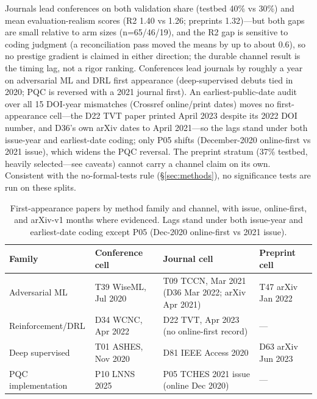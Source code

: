 Journals lead conferences on both validation share (testbed 40\% vs 30\%) and mean evaluation-realism scores (R2 1.40 vs 1.26; preprints 1.32)---but both gaps are small relative to arm sizes (n=65/46/19), and the R2 gap is sensitive to coding judgment (a reconciliation pass moved the means by up to about 0.6), so no prestige gradient is claimed in either direction; the durable channel result is the timing lag, not a rigor ranking. Conferences lead journals by roughly a year on adversarial ML and DRL first appearance (deep-supervised debuts tied in 2020; PQC is reversed with a 2021 journal first). An earliest-public-date audit over all 15 DOI-year mismatches (Crossref online/print dates) moves no first-appearance cell---the D22 TVT paper printed April 2023 despite its 2022 DOI number, and D36's own arXiv dates to April 2021---so the lags stand under both issue-year and earliest-date coding; only P05 shifts (December-2020 online-first vs 2021 issue), which widens the PQC reversal. The preprint stratum (37\% testbed, heavily selected---see caveats) cannot carry a channel claim on its own. Consistent with the no-formal-tests rule (\S\ref{sec:methods}), no significance tests are run on these splits.

\begin{table}[tbp]
\centering
\footnotesize
\caption{First-appearance papers by method family and channel, with issue, online-first, and arXiv-v1 months where evidenced. Lags stand under both issue-year and earliest-date coding except P05 (Dec-2020 online-first vs 2021 issue).}
\label{tab:firstappear}
\begin{tabular}{@{}l l p{4.6cm} l@{}}
\toprule
Family & Conference cell & Journal cell & Preprint cell \\
\midrule
Adversarial ML & T39 WiseML, Jul 2020 & T09 TCCN, Mar 2021 (D36 Mar 2022; arXiv Apr 2021) & T47 arXiv Jan 2022 \\
Reinforcement/DRL & D34 WCNC, Apr 2022 & D22 TVT, Apr 2023 (no online-first record) & --- \\
Deep supervised & T01 ASHES, Nov 2020 & D81 IEEE Access 2020 & D63 arXiv Jun 2023 \\
PQC implementation & P10 LNNS 2025 & P05 TCHES 2021 issue (online Dec 2020) & --- \\
\bottomrule
\end{tabular}
\end{table}

